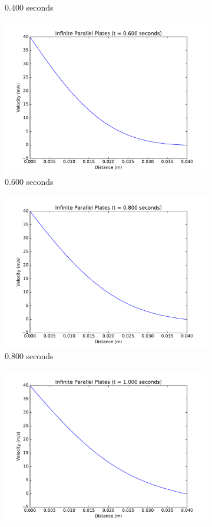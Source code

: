 \documentclass[addpoints]{exam}
\begin{document}
\begin{questions}
\begin{parts}
\begin{solution}
\begin{itemize}
\begin{figure}[H]
\begin{subfigure}{.5\textwidth}
  \caption{$0.400$ seconds}
  \label{fig:0.4_CN1}
\end{subfigure}
\begin{subfigure}{.5\textwidth}
  \centering
  \includegraphics[width=.8\linewidth]{figs/0-600_sec_plot_CN1.pdf}
  \caption{$0.600$ seconds}
  \label{fig:0.6_CN1}
\end{subfigure}
\begin{subfigure}{.5\textwidth}
  \centering
  \includegraphics[width=.8\linewidth]{figs/0-800_sec_plot_CN1.pdf}
  \caption{$0.800$ seconds}
  \label{fig:0.8_CN1}
\end{subfigure}
\begin{subfigure}{.5\textwidth}
  \centering
  \includegraphics[width=.8\linewidth]{figs/1-000_sec_plot_CN1.pdf}

\end{subfigure}
\end{figure}
\end{itemize}
\end{solution}
\end{parts}
\end{questions}
\end{document}
